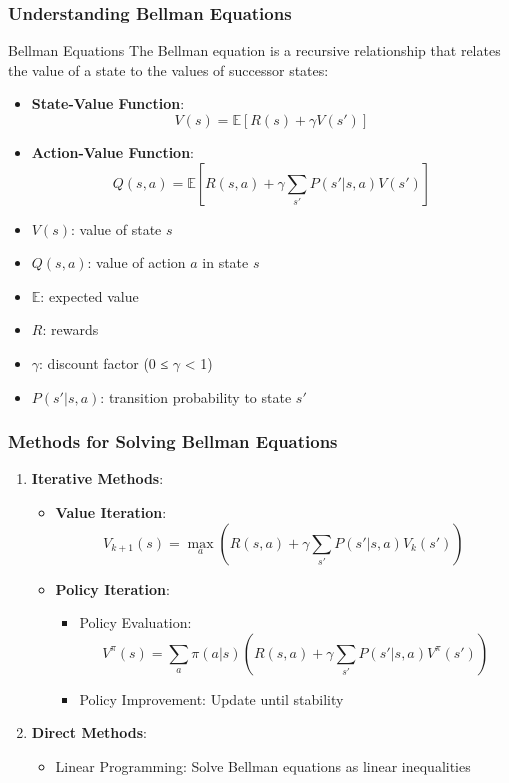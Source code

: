 \documentclass[aspectratio=169]{beamer}
\begin{document}
\begin{frame}[fragile]
    \frametitle{Understanding Bellman Equations}
    \begin{block}{Bellman Equations}
        The Bellman equation is a recursive relationship that relates the value of a state to the values of successor states:
        \begin{itemize}
            \item \textbf{State-Value Function}:
            \[
            V(s) = \mathbb{E}[R(s) + \gamma V(s')]
            \]
            \item \textbf{Action-Value Function}:
            \[
            Q(s, a) = \mathbb{E}[R(s, a) + \gamma \sum_{s'} P(s'|s,a) V(s')]
            \]
        \end{itemize}
    \end{block}
    \begin{itemize}
        \item \( V(s) \): value of state \( s \)
        \item \( Q(s, a) \): value of action \( a \) in state \( s \)
        \item \( \mathbb{E} \): expected value
        \item \( R \): rewards
        \item \( \gamma \): discount factor (0 ≤ \( \gamma \) < 1)
        \item \( P(s'|s,a) \): transition probability to state \( s' \)
    \end{itemize}
\end{frame}

\begin{frame}[fragile]
    \frametitle{Methods for Solving Bellman Equations}
    \begin{enumerate}
        \item \textbf{Iterative Methods}:
        \begin{itemize}
            \item \textbf{Value Iteration}:
            \[
            V_{k+1}(s) = \max_a \left( R(s, a) + \gamma \sum_{s'} P(s'|s,a) V_k(s') \right)
            \]
            \item \textbf{Policy Iteration}:
            \begin{itemize}
                \item Policy Evaluation:
                \[
                V^{\pi}(s) = \sum_a \pi(a|s) \left( R(s, a) + \gamma \sum_{s'} P(s'|s,a) V^{\pi}(s') \right)
                \]
                \item Policy Improvement: Update until stability
            \end{itemize}
        \end{itemize}
    
        \item \textbf{Direct Methods}:
        \begin{itemize}
            \item Linear Programming: Solve Bellman equations as linear inequalities
        \end{itemize}
    \end{enumerate}
\end{frame}
\end{document}
